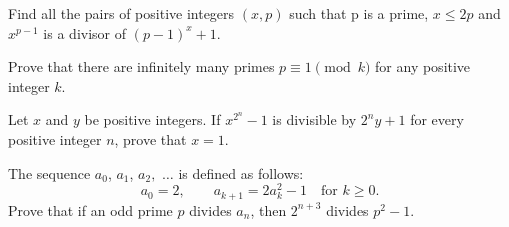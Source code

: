 \documentclass[mast]{lucky}
\begin{document}
\begin{prob}[IMO 1999/4]{6}
Find all the pairs of positive integers $(x,p)$ such that p is a prime, $x \leq 2p$ and $x^{p-1}$ is a divisor of $ (p-1)^{x}+1$.
\end{prob}

\begin{prob}{9}
Prove that there are infinitely many primes $p\equiv 1\pmod{k}$ for any positive integer $k$.
\end{prob}

\begin{prob}[ISL 2012/N6]{9}
Let $x$ and $y$ be positive integers. If ${x^{2^n}}-1$ is divisible by $2^ny+1$ for every positive integer $n$, prove that $x=1$.
\end{prob}

\begin{prob}[ISL 2003/N7]{13}
The sequence $a_0$, $a_1$, $a_2,$ $\ldots$ is defined as follows:
\[a_0=2, \qquad a_{k+1}=2a_k^2-1 \quad\text{for }k \geq 0.\]
Prove that if an odd prime $p$ divides $a_n$, then $2^{n+3}$ divides $p^2-1$.
\end{prob}

\end{document}
